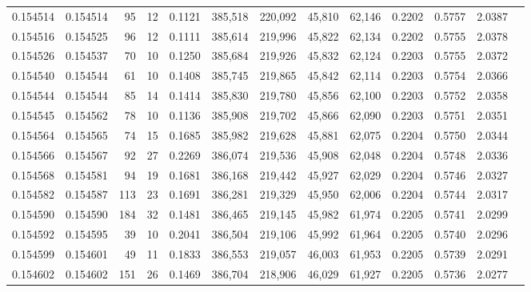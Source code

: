 \begin{tabular}{rrrrrrrrrrrrr}
0.154514 & 0.154514 &    95 &  12 &                                     0.1121 & 385,518 & 220,092 &  45,810 &  62,146 & 0.2202 & 0.5757 & 2.0387 \\
0.154516 & 0.154525 &    96 &  12 &                                     0.1111 & 385,614 & 219,996 &  45,822 &  62,134 & 0.2202 & 0.5755 & 2.0378 \\
0.154526 & 0.154537 &    70 &  10 &                                     0.1250 & 385,684 & 219,926 &  45,832 &  62,124 & 0.2203 & 0.5755 & 2.0372 \\
0.154540 & 0.154544 &    61 &  10 &                                     0.1408 & 385,745 & 219,865 &  45,842 &  62,114 & 0.2203 & 0.5754 & 2.0366 \\
0.154544 & 0.154544 &    85 &  14 &                                     0.1414 & 385,830 & 219,780 &  45,856 &  62,100 & 0.2203 & 0.5752 & 2.0358 \\
0.154545 & 0.154562 &    78 &  10 &                                     0.1136 & 385,908 & 219,702 &  45,866 &  62,090 & 0.2203 & 0.5751 & 2.0351 \\
0.154564 & 0.154565 &    74 &  15 &                                     0.1685 & 385,982 & 219,628 &  45,881 &  62,075 & 0.2204 & 0.5750 & 2.0344 \\
0.154566 & 0.154567 &    92 &  27 &                                     0.2269 & 386,074 & 219,536 &  45,908 &  62,048 & 0.2204 & 0.5748 & 2.0336 \\
0.154568 & 0.154581 &    94 &  19 &                                     0.1681 & 386,168 & 219,442 &  45,927 &  62,029 & 0.2204 & 0.5746 & 2.0327 \\
0.154582 & 0.154587 &   113 &  23 &                                     0.1691 & 386,281 & 219,329 &  45,950 &  62,006 & 0.2204 & 0.5744 & 2.0317 \\
0.154590 & 0.154590 &   184 &  32 &                                     0.1481 & 386,465 & 219,145 &  45,982 &  61,974 & 0.2205 & 0.5741 & 2.0299 \\
0.154592 & 0.154595 &    39 &  10 &                                     0.2041 & 386,504 & 219,106 &  45,992 &  61,964 & 0.2205 & 0.5740 & 2.0296 \\
0.154599 & 0.154601 &    49 &  11 &                                     0.1833 & 386,553 & 219,057 &  46,003 &  61,953 & 0.2205 & 0.5739 & 2.0291 \\
0.154602 & 0.154602 &   151 &  26 &                                     0.1469 & 386,704 & 218,906 &  46,029 &  61,927 & 0.2205 & 0.5736 & 2.0277 \\

\end{tabular}
